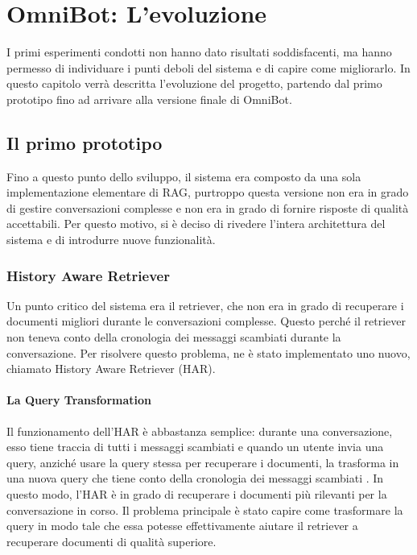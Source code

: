 \chapter{OmniBot: L'evoluzione}
I primi esperimenti condotti non hanno dato risultati soddisfacenti, ma hanno permesso di individuare i punti deboli del sistema e di capire come migliorarlo. In questo capitolo verrà descritta l'evoluzione del progetto, partendo dal primo prototipo fino ad arrivare alla versione finale di OmniBot.

\section{Il primo prototipo}
Fino a questo punto dello sviluppo, il sistema era composto da una sola implementazione elementare di RAG, purtroppo questa versione non era in grado di gestire conversazioni complesse e non era in grado di fornire risposte di qualità accettabili. Per questo motivo, si è deciso di rivedere l'intera architettura del sistema e di introdurre nuove funzionalità.

\subsection{History Aware Retriever}
Un punto critico del sistema era il retriever, che non era in grado di recuperare i documenti migliori durante le conversazioni complesse. Questo perché il retriever non teneva conto della cronologia dei messaggi scambiati durante la conversazione. Per risolvere questo problema, ne è stato implementato uno nuovo, chiamato History Aware Retriever (HAR).

\subsubsection{La Query Transformation}
Il funzionamento dell'HAR è abbastanza semplice: durante una conversazione, esso tiene traccia di tutti i messaggi scambiati e quando un utente invia una query, anziché usare la query stessa per recuperare i documenti, la trasforma in una nuova query che tiene conto della cronologia dei messaggi scambiati \cite{fu2023complexitybasedpromptingmultistepreasoning}. In questo modo, l'HAR è in grado di recuperare i documenti più rilevanti per la conversazione in corso.
Il problema principale è stato capire come trasformare la query in modo tale che essa potesse effettivamente aiutare il retriever a recuperare documenti di qualità superiore.

